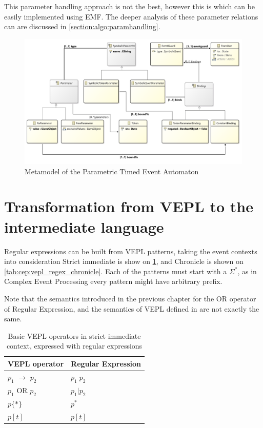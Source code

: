 This parameter handling approach is not the best, however this is which can be easily implemented using EMF.
The deeper analysis of these parameter relations can are discussed in \cref{section:algo:paramhandling}.

\begin{figure}[h]
	\centering
	\includegraphics[width=\linewidth]{figures/chapter_5/Parameters_diagram}
	\caption{Metamodel of the Parametric Timed Event Automaton}
	\label{fig:algo:parametric_automaton}
\end{figure}

\section{Transformation from VEPL to the intermediate language}

Regular expressions can be built from VEPL patterns, taking the event contexts into consideration
Strict immediate is show on \cref{tab:cep:vepl_regex_strict}, and Chronicle is shown on \cref{tab:cep:vepl_regex_chronicle}.
Each of the patterns must start with a $\Sigma^*$, as in Complex Event Processing every pattern might have arbitrary prefix.

Note that the semantics introduced in the previous chapter for the OR operator of Regular Expression, and the semantics of VEPL defined in\citep{davidi} are not exactly the same.

\begin{table}
	\caption{Basic VEPL operators in strict immediate context, expressed with regular expressions}		
	\label{tab:cep:vepl_regex_strict}
	\centering
	\begin{tabular}{@{}ll@{}}
		\toprule
		VEPL operator             & Regular Expression \\ \midrule
		$p_1$ $\rightarrow$ $p_2$ & $p_1\; p_2$        \\
		$p_1$ OR $p_2$            & $p_1|p_2$          \\
		$p\{\ast\}$               & $p^*$              \\
		$p[t]$                    & $p[t]$             \\ \bottomrule
	\end{tabular}
\end{table}

